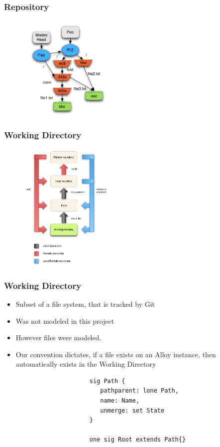 \documentclass{beamer}
\begin{document}
\begin{frame}
	\frametitle{Repository}
	\begin{figure}
		\centering
		\includegraphics[width=0.4\textwidth]{images/object_assoc.png}
	\end{figure}
\end{frame}

\begin{frame}
   \frametitle{Working Directory}
   \begin{figure}
      \centering
      \includegraphics[width=0.4\textwidth]{images/workflow3.png}
   \end{figure}
\end{frame}

\begin{frame}[fragile]
   \frametitle{Working Directory}
   \begin{itemize}
      	\item Subset of a file system, that is tracked by Git
   	\item Was not modeled in this project
	\item However files were modeled. 
	\item Our convention dictates, if a file exists on an Alloy
	instance, then automatically exists in the Working Directory
   \end{itemize}
   \tiny
   \color{blue}
   \begin{lstlisting}
                        sig Path {
                           pathparent: lone Path,
                           name: Name,
                           unmerge: set State
                        }

                        one sig Root extends Path{}
   \end{lstlisting}
\end{frame}
\end{document}
